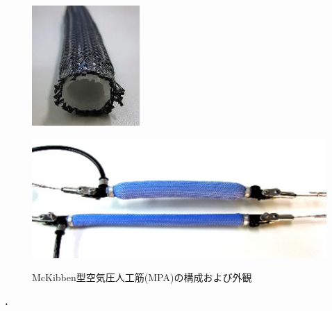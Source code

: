 \begin{figure}[ht]
    \begin{minipage}{0.49\columnwidth}
      \vspace{4mm}
      \centering
      \includegraphics[scale=1]{pic/MPA_kousei.png}
      \vspace{3mm}
      \label{fig:Structure}
    \end{minipage}
    \begin{minipage}{0.49\columnwidth}
      \vspace{25mm}
      \centering
      \includegraphics[scale=0.8]{pic/MPA_dousa.png}
      \label{fig:move}
    \end{minipage}
    \caption{McKibben型空気圧人工筋(MPA)の構成および外観\cite{22}}
    \label{fig:MPA}
  \end{figure}．
\newpage

